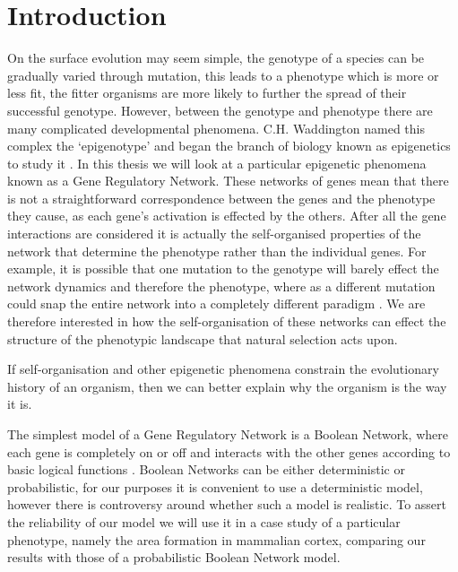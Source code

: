\documentclass[a4paper,11pt]{article}
\begin{document}
\newpage{}

\tableofcontents

\newpage{}

\clearpage
\setcounter{page}{1}

\section{Introduction}
\linenumbers

On the surface evolution may seem simple, the genotype of a species can be gradually varied through mutation, this leads to a phenotype which is more or less fit, the fitter organisms are more likely to further the spread of their successful genotype. However, between the genotype and phenotype there are many complicated developmental phenomena. C.H. Waddington named this complex the ‘epigenotype’ and began the branch of biology known as epigenetics to study it \citep{Waddington2012}. In this thesis we will look at a particular epigenetic phenomena known as a Gene Regulatory Network. These networks of genes mean that there is not a straightforward correspondence between the genes and the phenotype they cause, as each gene's activation is effected by the others. After all the gene interactions are considered it is actually the self-organised properties of the network that determine the phenotype rather than the individual genes. For example, it is possible that one mutation to the genotype will barely effect the network dynamics and therefore the phenotype, where as a different mutation could snap the entire network into a completely different paradigm \citep{Jaeger2014}.  We are therefore interested in how the self-organisation of these networks can effect the structure of the phenotypic landscape that natural selection acts upon.\par

If self-organisation and other epigenetic phenomena constrain the evolutionary history of an organism, then we can better explain why the organism is the way it is.\par

The simplest model of a Gene Regulatory Network is a Boolean Network, where each gene is completely on or off and interacts with the other genes according to basic logical functions \citep{Kauffman1995} \citep{Bornholdt2008}. Boolean Networks can be either deterministic or probabilistic, for our purposes it is convenient to use a deterministic model, however there is controversy around whether such a model is realistic. To assert the reliability of our model we will use it in a case study of a particular phenotype, namely the area formation in mammalian cortex, comparing our results with those of a probabilistic Boolean Network model.\par
\end{document}
